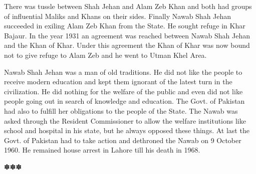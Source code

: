 \documentclass[twoside,openright]{book}
\begin{document}
There was tussle between Shah Jehan and Alam Zeb Khan and both had groups of
influential Maliks and Khans on their sides. Finally Nawab Shah Jehan succeeded
in exiling Alam Zeb Khan from the State. He sought refuge in Khar Bajaur. In the
year 1931 an agreement was reached between Nawab Shah Jehan and the Khan of
Khar. Under this agreement the Khan of Khar was now bound not to give refuge to
Alam Zeb and he went to Utman Khel Area.

Nawab Shah Jehan was a man of old traditions. He did not like the people to
receive modern education and kept them ignorant of the latest turn in the
civilization. He did nothing for the welfare of the public and even did not like
people going out in search of knowledge and education. The Govt. of Pakistan had
also to fulfill her obligations to the people of the State. The Nawab was asked
through the Resident Commissioner to allow the welfare institutions like school
and hospital in his state, but he always opposed these things. At last the Govt.
of Pakistan had to take action and dethroned the Nawab on 9 October 1960. He
remained house arrest in Lahore till his death in 1968.


\centerline{✽\quad ✽\quad ✽}
\end{document}
